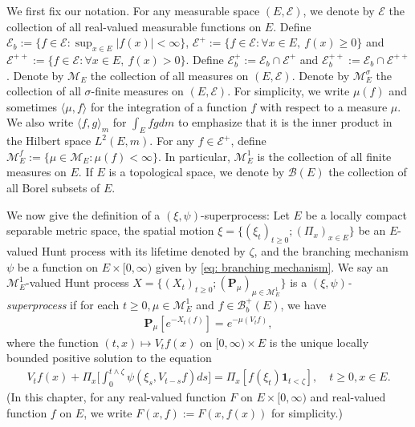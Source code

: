 	We first fix our notation.
	For any measurable space $(E,\mathscr E)$, we denote by $\mathscr E$ the collection of all real-valued measurable functions on $E$.
	Define $\mathscr E_b :=\{f \in \mathscr E: \sup_{x\in E}|f(x)|<\infty \}$, $\mathscr E^+ :=\{f\in \mathscr E: \forall x\in E,~f(x)\geq 0\}$ and $\mathscr E^{++} :=\{f\in \mathscr E: \forall x\in E,~f(x)> 0\}$.
	Define $\mathscr E^+_b := \mathscr E_b \cap \mathscr E^+$ and $\mathscr E^{++}_b:= \mathscr E_b \cap \mathscr E^{++}$.
	Denote by $\mathcal M_E$ the collection of all measures on $(E,\mathscr E)$.
	Denote by $\mathcal M^\sigma_E$ the collection of all  $\sigma$-finite measures on $(E,\mathscr E)$.
	For simplicity, we write $\mu(f)$ and sometimes $\langle \mu, f\rangle$ for the integration of a function $f$ with respect to a measure $\mu$.
    We also write $\langle f, g\rangle_m$ for $\int_E fg dm$ to emphasize that it is the inner product in the Hilbert space $L^2(E, m)$.
	For any $f \in \mathscr E^+$, define $\mathcal M^f_E:= \{\mu \in \mathcal M_E: \mu(f) < \infty\}$.
	In particular, $\mathcal M^1_E$ is the collection of all  finite measures on $E$.
	If $E$ is a topological space, we denote by $\mathscr B(E)$ the collection of all  Borel subsets of $E$.
	
	We now give the definition of a $(\xi, \psi)$-superprocess:
	Let $E$ be a locally compact separable metric space, the spatial motion $\xi=\{(\xi_t)_{t\geq 0};(\Pi_x)_{x\in E}\}$ be an $E$-valued Hunt process with its lifetime denoted by $\zeta$, and the branching mechanism $\psi$ be a function on $E\times[0,\infty)$ given by \eqref{eq: branching mechanism}.
	We say an $\mathcal M^1_E$-valued Hunt process $X=\{(X_t)_{t\geq 0}; (\mathbf P_\mu)_{\mu \in \mathcal M^1_E}\}$ is a \emph{$(\xi,\psi)$-superprocess} if for each $t\geq 0, \mu \in \mathcal M_E^1$ and  $f\in \mathscr B^+_b(E)$, we have
\begin{align}
	\mathbf P_\mu [e^{-X_t(f)}] = e^{-\mu(V_tf)},
\end{align}
	where the function $(t,x) \mapsto V_tf(x)$ on $[0,\infty) \times E$ is the unique locally bounded positive solution to the equation
\begin{align}\label{eq:FKPP_in_definition}
	V_t f(x) + \Pi_x \Big[  \int_0^{t\wedge \zeta} \psi (\xi_s,V_{t-s} f) ds \Big]
	= \Pi_x [ f(\xi_t)\mathbf 1_{t<\zeta} ],
	\quad t \geq 0, x \in E.
\end{align}
	(In this chapter, for any real-valued function $F$ on $E\times [0,\infty)$ and real-valued function $f$ on $E$, we write $F(x,f):= F(x,f(x))$ for simplicity.)

